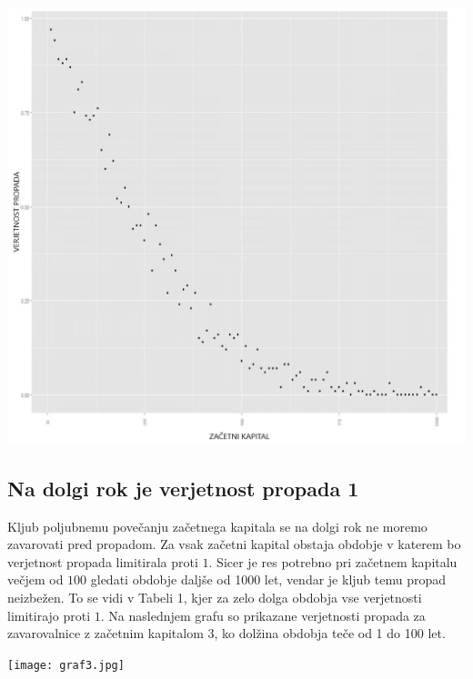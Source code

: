 \documentclass[a4paper,12pt]{homework}
\begin{document}
	\begin{center}
		\includegraphics[scale=0.32]{graf1.jpg}  
	\end{center}
	
	\subsection{Na dolgi rok je verjetnost propada 1}
	Kljub poljubnemu povečanju začetnega kapitala se na dolgi rok ne moremo zavarovati pred propadom. Za vsak začetni kapital obstaja obdobje v katerem bo verjetnost propada limitirala proti $1$. Sicer je res potrebno pri začetnem kapitalu večjem od $100$ gledati obdobje daljše od 1000 let, vendar je kljub temu propad neizbežen. To se vidi v Tabeli 1, kjer za zelo dolga obdobja vse verjetnosti limitirajo proti $1$. Na naslednjem grafu so prikazane verjetnosti propada za zavarovalnice z začetnim kapitalom $3$, ko dolžina obdobja teče od 1 do 100 let.
	
	\begin{center}
		\texttt{[image: graf3.jpg]}  
	\end{center}
	
\end{document}
